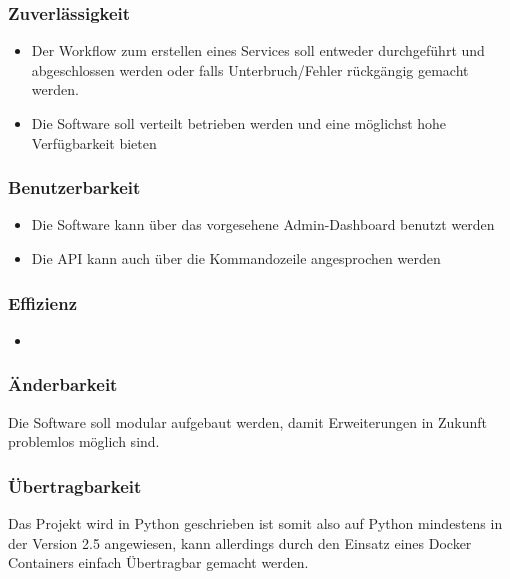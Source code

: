 \documentclass[11pt]{scrartcl}
\begin{document}
\subsubsection{Zuverlässigkeit}
\begin{itemize}
  \item Der Workflow zum erstellen eines Services soll entweder durchgeführt und 
  abgeschlossen werden oder falls Unterbruch/Fehler rückgängig gemacht 
  werden.
  \item Die Software soll verteilt betrieben werden und eine möglichst hohe 
  Verfügbarkeit bieten
\end{itemize}
\subsubsection{Benutzerbarkeit}
\begin{itemize}
  \item Die Software kann über das vorgesehene Admin-Dashboard benutzt werden
  \item Die API kann auch über die Kommandozeile angesprochen werden
\end{itemize}
\subsubsection{Effizienz}
\begin{itemize}
  \item 
\end{itemize}
\subsubsection{Änderbarkeit}
Die Software soll modular aufgebaut werden, damit Erweiterungen in Zukunft 
problemlos möglich sind.
\subsubsection{Übertragbarkeit}
Das Projekt wird in Python geschrieben ist somit also auf Python mindestens in der Version 2.5 angewiesen, 
kann allerdings durch den Einsatz eines Docker Containers einfach Übertragbar 
gemacht werden.
\end{document}
